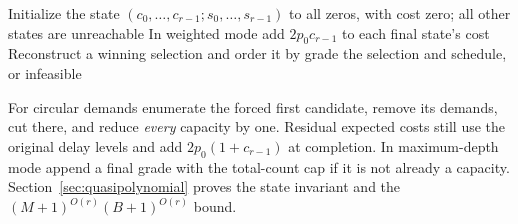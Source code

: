 \begin{algorithm}[H]
\caption{\GradeDP: cumulative-grade interval feasibility or weighted delay}
\label{alg:grade-dp}
Initialize the state $(c_0,\ldots,c_{r-1};s_0,\ldots,s_{r-1})$ to all zeros,
with cost zero; all other states are unreachable\;
In weighted mode add $2p_0c_{r-1}$ to each final state's cost\;
Reconstruct a winning selection and order it by grade\;
\KwRet the selection and schedule, or infeasible\;
\end{algorithm}

For circular demands enumerate the forced first candidate, remove
its demands, cut there, and reduce \emph{every} capacity by one.
Residual expected costs still use the original delay levels and add
$2p_0(1+c_{r-1})$ at completion. In maximum-depth mode append a final
grade with the total-count cap if it is not already a capacity.
Section~\ref{sec:quasipolynomial} proves the state invariant and
the $(M+1)^{O(r)}(B+1)^{O(r)}$ bound.

